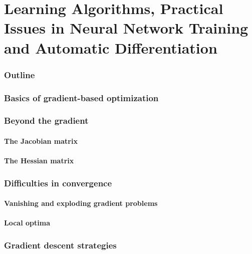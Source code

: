 \renewcommand{\thispart}{4 }
\renewcommand{\thispartname}{
    Learning Algorithms, 
    Practical Issues in Neural Network Training 
    and Automatic Differentiation}

\part{\thispartname}

\section{Outline}




\section{Basics of gradient-based optimization}

\section{Beyond the gradient}
\subsection{The Jacobian matrix}

\subsection{The Hessian matrix}


\section{Difficulties in convergence}

\subsection{Vanishing and exploding gradient problems}

\subsection{Local optima}

\section{Gradient descent strategies}

